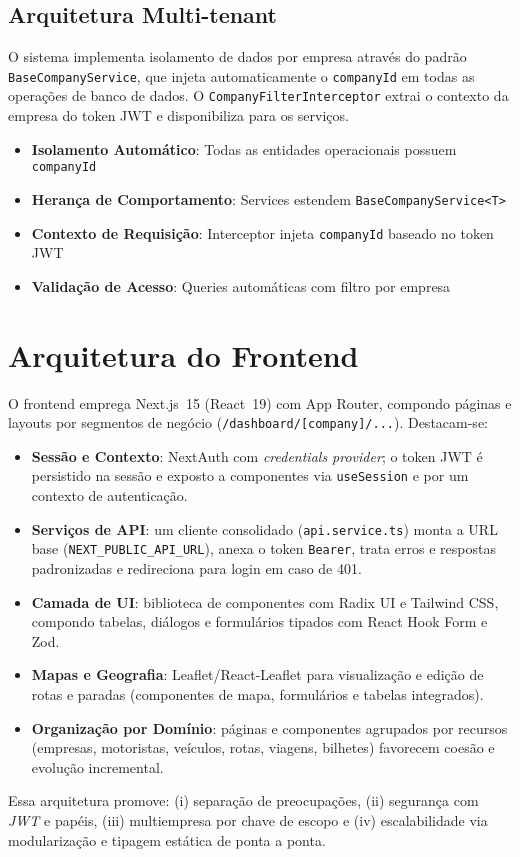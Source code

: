 \subsection{Arquitetura Multi-tenant}

O sistema implementa isolamento de dados por empresa através do padrão \texttt{BaseCompanyService}, que injeta automaticamente o \texttt{companyId} em todas as operações de banco de dados. O \texttt{CompanyFilterInterceptor} extrai o contexto da empresa do token JWT e disponibiliza para os serviços.

\begin{itemize}
  \item \textbf{Isolamento Automático}: Todas as entidades operacionais possuem \texttt{companyId}
  \item \textbf{Herança de Comportamento}: Services estendem \texttt{BaseCompanyService<T>}
  \item \textbf{Contexto de Requisição}: Interceptor injeta \texttt{companyId} baseado no token JWT
  \item \textbf{Validação de Acesso}: Queries automáticas com filtro por empresa
\end{itemize}

\section{Arquitetura do Frontend}
O frontend emprega Next.js~15 (React~19) com App Router, compondo páginas e layouts por segmentos de negócio (\texttt{/dashboard/[company]/...}). Destacam-se:

\begin{itemize}
  \item \textbf{Sessão e Contexto}: NextAuth com \textit{credentials provider}; o token JWT é persistido na sessão e exposto a componentes via \texttt{useSession} e por um contexto de autenticação.
  \item \textbf{Serviços de API}: um cliente consolidado (\texttt{api.service.ts}) monta a URL base (\texttt{NEXT\_PUBLIC\_API\_URL}), anexa o token \texttt{Bearer}, trata erros e respostas padronizadas e redireciona para login em caso de 401.
  \item \textbf{Camada de UI}: biblioteca de componentes com Radix UI e Tailwind CSS, compondo tabelas, diálogos e formulários tipados com React Hook Form e Zod.
  \item \textbf{Mapas e Geografia}: Leaflet/React-Leaflet para visualização e edição de rotas e paradas (componentes de mapa, formulários e tabelas integrados).
  \item \textbf{Organização por Domínio}: páginas e componentes agrupados por recursos (empresas, motoristas, veículos, rotas, viagens, bilhetes) favorecem coesão e evolução incremental.
\end{itemize}

Essa arquitetura promove: (i) separação de preocupações, (ii) segurança com \textit{JWT} e papéis, (iii) multiempresa por chave de escopo e (iv) escalabilidade via modularização e tipagem estática de ponta a ponta.
